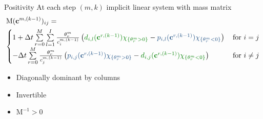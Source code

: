 \documentclass[9pt,compress,t,aspectratio=169]{beamer}
\newcommand{\1}{\begin{pmatrix}
                 1\\
                 1
                \end{pmatrix}}
\def\bbc{\underline{\mathbf{c}}}
\def\bc{\mathbf{c}}
\def\M{\mathrm{M}}
\begin{document}
\begin{frame}{Positivity}
At each step $(m,k)$ implicit linear system with mass matrix 
\begin{equation*}\label{eq:mass_matrix}
\begin{split}
&\M(\bc^{m,(k-1)})_{ij}= \\
&\!\begin{cases}
1+\Delta t \sum\limits_{r=0}^M \sum\limits_{l=1}^I  \frac{\theta_r^m}{c_i^{m,(k-1)}}   \left( {\color{lightgreen} d_{i,l}(\bc^{r,(k-1)})  \chi_{\lbrace \theta^m_r>0\rbrace}}  -{\color{lightblue} p_{i,l} (\bc^{r,(k-1)})\chi_{\lbrace \theta^m_r<0 \rbrace}} \right)  \,&\text{for }i=j\\
-\Delta t \sum\limits_{r=0}^M \frac{\theta_r^m}{c_j^{m,(k-1)}} \left({\color{lightblue}  p_{i,j}(\bc^{r,(k-1)})\chi_{\lbrace \theta^m_r>0\rbrace}} -{\color{lightgreen} d_{i,j} (\bc^{r,(k-1)})\chi_{\lbrace \theta^m_r<0\rbrace}} \right)  \, &\text{for }i\ne j
\end{cases}
\end{split}
\end{equation*}

\begin{itemize}
\item Diagonally dominant by columns
\item Invertible
\item $\M^{-1}>0$
\end{itemize}

\end{frame}

%
\end{document}
